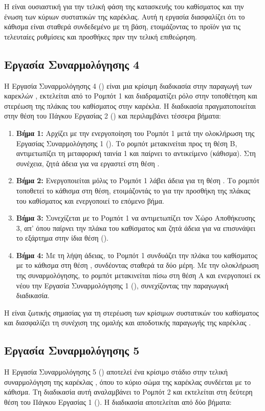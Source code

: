 Η  είναι ουσιαστική για την τελική φάση της κατασκευής του καθίσματος και την ένωση των κύριων συστατικών της καρέκλας. Αυτή η εργασία διασφαλίζει ότι το κάθισμα είναι σταθερά συνδεδεμένο με τη βάση, ετοιμάζοντας το προϊόν για τις τελευταίες ρυθμίσεις και προσθήκες πριν την τελική επιθεώρηση.

\subsection{Εργασία Συναρμολόγησης 4}
\noindent Η Εργασία Συναρμολόγησης 4 () είναι μια κρίσιμη διαδικασία στην παραγωγή των καρεκλών , εκτελείται από το Ρομπότ 1 και διαδραματίζει ρόλο στην τοποθέτηση και στερέωση της πλάκας του καθίσματος στην καρέκλα. Η διαδικασία πραγματοποιείται στην θέση του Πάγκου Εργασίας 2 () και περιλαμβάνει τέσσερα βήματα:

\begin{enumerate}
  \item \textbf{Βήμα 1:} Αρχίζει με την ενεργοποίηση του Ρομπότ 1 μετά την ολοκλήρωση της Εργασίας Συναρμολόγησης 1 (). Το ρομπότ μετακινείται προς τη θέση Β, αντιμετωπίζει τη μεταφορική ταινία 1 και παίρνει το αντικείμενο (κάθισμα). Στη συνέχεια, ζητά άδεια για να εργαστεί στη θέση .
  \item \textbf{Βήμα 2:} Ενεργοποιείται μόλις το Ρομπότ 1 λάβει άδεια για τη θέση . Το ρομπότ τοποθετεί το κάθισμα στη θέση, ετοιμάζοντάς το για την προσθήκη της πλάκας του καθίσματος και ενεργοποιεί το επόμενο βήμα.
  \item \textbf{Βήμα 3:} Συνεχίζεται με το Ρομπότ 1 να αντιμετωπίζει τον Χώρο Αποθήκευσης 3, απ' όπου παίρνει την πλάκα του καθίσματος και ζητά άδεια για να επισυνάψει το εξάρτημα στην ίδια θέση ().
  \item \textbf{Βήμα 4:} Με τη λήψη άδειας, το Ρομπότ 1 συνδυάζει την πλάκα του καθίσματος με το κάθισμα στη θέση , συνδέοντας σταθερά τα δύο μέρη. Με την ολοκλήρωση της συναρμολόγησης, το ρομπότ μετακινείται πίσω στη θέση Α και ενεργοποιεί εκ νέου την Εργασία Συναρμολόγησης 1 (), συνεχίζοντας την παραγωγική διαδικασία.
\end{enumerate}

Η  είναι ζωτικής σημασίας για τη στερέωση των κρίσιμων συστατικών του καθίσματος και διασφαλίζει τη συνέχιση της ομαλής και αποδοτικής παραγωγής της καρέκλας .

\subsection{Εργασία Συναρμολόγησης 5}
\noindent Η Εργασία Συναρμολόγησης 5 () αποτελεί ένα κρίσιμο στάδιο στην τελική συναρμολόγηση της καρέκλας , όπου το κύριο σώμα της καρέκλας συνδέεται με το κάθισμα. Τη διαδικασία αυτή αναλαμβάνει το Ρομπότ 2 και εκτελείται στη δεύτερη θέση του Πάγκου Εργασίας 1 (). Η διαδικασία  αποτελείται από δύο βήματα:

